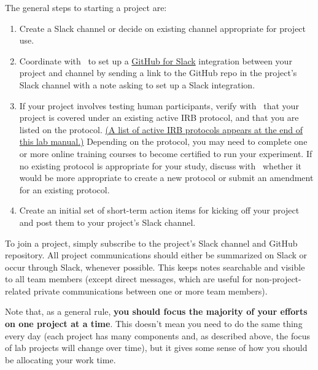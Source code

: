 \documentclass{tufte-book} %
\begin{document}
The general steps to starting a project are:
\begin{enumerate}

\item Create a Slack channel or decide on existing channel appropriate
  for project use.  
\item Coordinate with \director~to set up a
  \href{https://get.slack.help/hc/en-us/articles/232289568-GitHub-for-Slack}{GitHub
    for Slack} integration between your project and channel by sending
  a link to the GitHub repo in the project's Slack channel with a note
  asking to set up a Slack integration.
\item If your project involves testing human participants, verify with
  \director~that your project is covered under an existing active IRB
  protocol, and that you are listed on the protocol.
  \hyperref[ch:irb]{(A list of active IRB protocols appears at the end
    of this lab manual.)}  Depending on the protocol, you may need to
  complete one or more online training courses to become certified to
  run your experiment.  If no existing protocol is appropriate for
  your study, discuss with \director~whether it would be more
  appropriate to create a new protocol or submit an amendment for an
  existing protocol.
\item Create an initial set of short-term action items for kicking off
  your project and post them to your project's Slack channel.
\end{enumerate}


{}

\noindent To join a project, simply subscribe to the project's Slack
channel and GitHub repository.  All project communications should
either be summarized on Slack or occur through Slack, whenever
possible.  This keeps notes searchable and visible to all team members
(except direct messages, which are useful for non-project-related
private communications between one or more team members).

Note that, as a general rule, \textbf{you should focus the majority of your
efforts on one project at a time}.  This doesn't mean you need to do
the same thing every day (each project has many components and, as
described above, the focus of lab projects will change over time), but
it gives some sense of how you should be allocating your work time.
\end{document}
